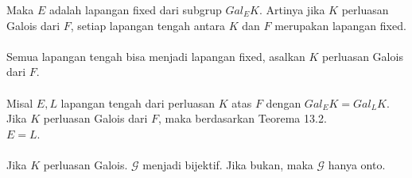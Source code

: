 Maka $E$ adalah lapangan fixed dari subgrup $Gal_EK$. Artinya jika $K$ perluasan Galois dari $F$, setiap lapangan tengah antara $K$ dan $F$ merupakan lapangan fixed.\\ \\
Semua lapangan tengah bisa menjadi lapangan fixed, asalkan $K$ perluasan Galois dari $F$.\\ \\
Misal $E,L$ lapangan tengah dari perluasan $K$ atas $F$ dengan $Gal_EK=Gal_LK$.\\
Jika $K$ perluasan Galois dari $F$, maka berdasarkan Teorema 13.2.\\
$E=L$.\\ \\
Jika $K$ perluasan Galois. $\mathcal{G}$ menjadi bijektif. Jika bukan, maka $\mathcal{G}$ hanya onto. 

